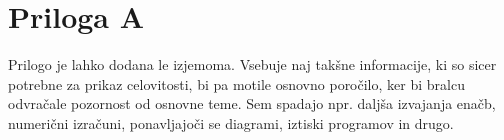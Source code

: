 
\chapter{Priloga A}\label{cha:priloga}
Prilogo je lahko dodana le izjemoma. Vsebuje naj takšne informacije, ki so sicer potrebne za prikaz celovitosti, bi pa motile osnovno poročilo, ker bi bralcu odvračale pozornost od osnovne teme. Sem spadajo npr. daljša izvajanja enačb, numerični izračuni, ponavljajoči se diagrami, iztiski programov in drugo. 